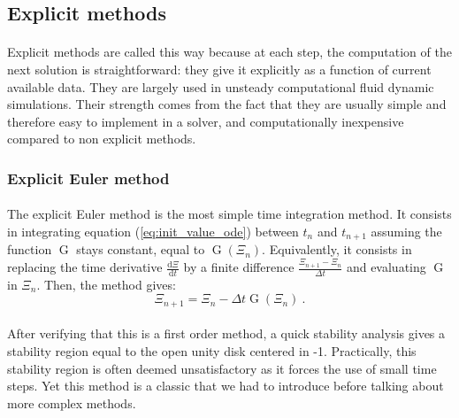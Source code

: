     \subsection{Explicit methods}

      \paragraph{}
      Explicit methods are called this way because at each step, the computation of the next solution is straightforward: they give it explicitly as a function of current available data.
      They are largely used in unsteady computational fluid dynamic simulations.
      Their strength comes from the fact that they are usually simple and therefore easy to implement in a solver, and computationally inexpensive compared to non explicit methods.


      \subsubsection{Explicit Euler method}

        \paragraph{}
        The explicit Euler method is the most simple time integration method.
        It consists in integrating equation (\ref{eq:init_value_ode}) between $t_n$ and $t_{n+1}$ assuming the function $\operatorname{G}$ stays constant, equal to $\operatorname{G}\left(\Xi_n\right)$.
        Equivalently, it consists in replacing the time derivative $\frac{\mathrm{d} \Xi}{\mathrm{d} t}$ by a finite difference $\frac{\Xi_{n+1} - \Xi_n}{\Delta t}$ and evaluating $\operatorname{G}$ in $\Xi_n$.
        Then, the method gives:
        \begin{equation}
          \Xi_{n+1} = \Xi_n - \Delta t \operatorname{G}\left(\Xi_n\right) \ .
        \end{equation}

        \paragraph{}
        After verifying that this is a first order method, a quick stability analysis gives a stability region equal to the open unity disk centered in -1.
        Practically, this stability region is often deemed unsatisfactory as it forces the use of small time steps.
        Yet this method is a classic that we had to introduce before talking about more complex methods.



